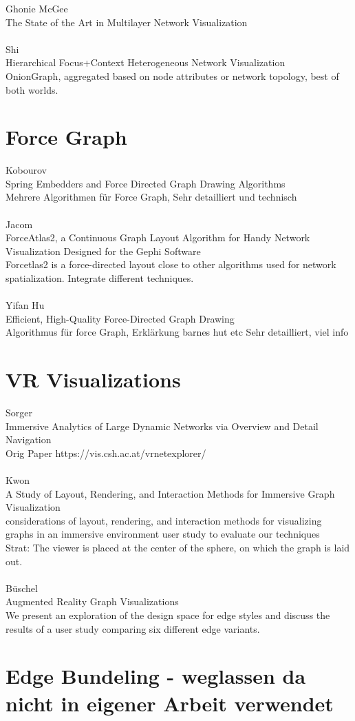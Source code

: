 Ghonie McGee\\
The State of the Art in Multilayer Network Visualization\\
\\
Shi\\
Hierarchical Focus+Context Heterogeneous Network Visualization\\
OnionGraph, aggregated based on node attributes or network topology,
best of both worlds.\\


\section{Force Graph}
Kobourov\\
Spring Embedders and Force Directed Graph Drawing Algorithms\\
Mehrere Algorithmen für Force Graph, Sehr detailliert und technisch \\
\\
Jacom\\
ForceAtlas2, a Continuous Graph Layout Algorithm for Handy Network Visualization Designed for the Gephi Software\\
Forcetlas2 is a force-directed layout close to other algorithms used for network spatialization. Integrate different techniques.\\
\\
Yifan Hu\\
Efficient, High-Quality Force-Directed Graph Drawing\\
Algorithmus für force Graph,  Erklärkung barnes hut etc Sehr detailliert, viel info\\

\section{VR Visualizations}

Sorger\\
Immersive Analytics of Large Dynamic Networks via Overview and Detail Navigation\\
Orig Paper https://vis.csh.ac.at/vrnetexplorer/\\
\\
Kwon\\
A Study of Layout, Rendering, and Interaction Methods for Immersive Graph Visualization\\
considerations of layout, rendering, and interaction methods for visualizing graphs in an  immersive environment user study to evaluate our techniques\\
Strat: The viewer is placed at the center of the sphere, on which the graph is laid out.\\
\\
Büschel\\
Augmented Reality Graph Visualizations\\
We present an exploration of the design space for edge styles and discuss the results of a user study comparing six different edge variants.\\

\section{Edge Bundeling - weglassen da nicht in eigener Arbeit verwendet}
